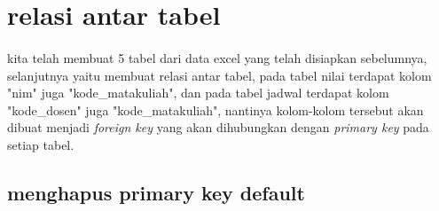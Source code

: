 \documentclass[12pt]{ociamthesis}  %
\begin{document}
\section{relasi antar tabel}
\paragraph{}
kita telah membuat 5 tabel dari data excel yang telah disiapkan sebelumnya, selanjutnya yaitu membuat relasi antar tabel, pada tabel nilai terdapat kolom "nim" juga "kode\_matakuliah", dan pada tabel jadwal terdapat kolom "kode\_dosen" juga "kode\_matakuliah", nantinya kolom-kolom tersebut akan dibuat menjadi \textit{foreign key} yang akan dihubungkan dengan \textit{primary key} pada setiap tabel. 
\subsection{menghapus primary key default}
\end{document}
